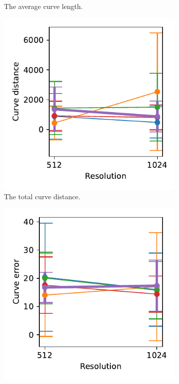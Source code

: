 \begin{figure}[h]
\begin{subfigure}{.3\textwidth}
    \caption{The average curve length.}
\end{subfigure}
    \begin{subfigure}{.3\textwidth}
    \centering
    \includegraphics[width=\textwidth]{graphics/eval/curve_distance_res.pdf}
    \caption{The total curve distance.}
    \label{fig:curve_distance_res}
\end{subfigure}
    \begin{subfigure}{.3\textwidth}
    \centering
    \includegraphics[width=\textwidth]{graphics/eval/curve_error_res.pdf}

\end{subfigure}
\end{figure}
